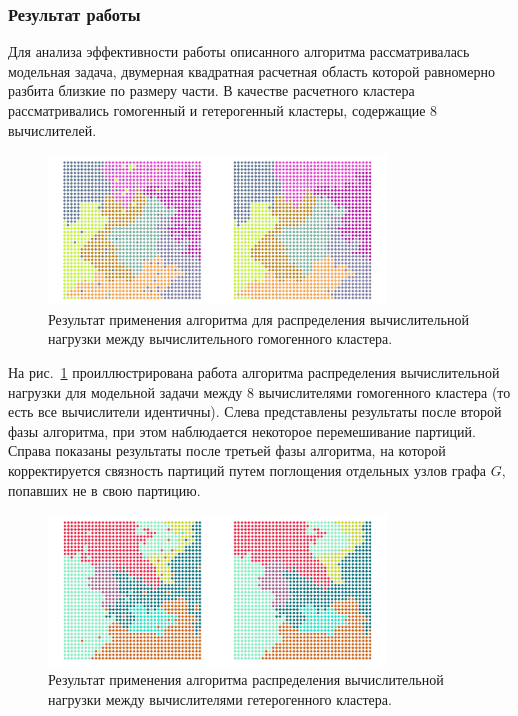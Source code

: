 \subsubsection{Результат работы}

Для анализа эффективности работы описанного алгоритма рассматривалась модельная задача, двумерная квадратная расчетная область которой равномерно разбита близкие по размеру части.
В качестве расчетного кластера рассматривались гомогенный и гетерогенный кластеры, содержащие 8 вычислителей.

\begin{figure}[ht]
\centering
\includegraphics[width=0.8\textwidth]{./pics/text_2_getero/res1small.png}
\singlespacing
{}\caption{Результат применения алгоритма для распределения вычислительной нагрузки между вычислительного гомогенного кластера.}
\label{fig:text_2_getero_res1}
\end{figure}

На рис.~\ref{fig:text_2_getero_res1} проиллюстрирована работа алгоритма распределения вычислительной нагрузки для модельной задачи между 8 вычислителями гомогенного кластера (то есть все вычислители идентичны).
Слева представлены результаты после второй фазы алгоритма, при этом наблюдается некоторое перемешивание партиций.
Справа показаны результаты после третьей фазы алгоритма, на которой корректируется связность партиций путем поглощения отдельных узлов графа $G$, попавших не в свою партицию.

\begin{figure}[ht]
\centering
\includegraphics[width=0.8\textwidth]{./pics/text_2_getero/res2small.png}
\singlespacing
{}\caption{Результат применения алгоритма распределения вычислительной нагрузки между вычислителями гетерогенного кластера.}
\label{fig:text_2_getero_res2}
\end{figure}

